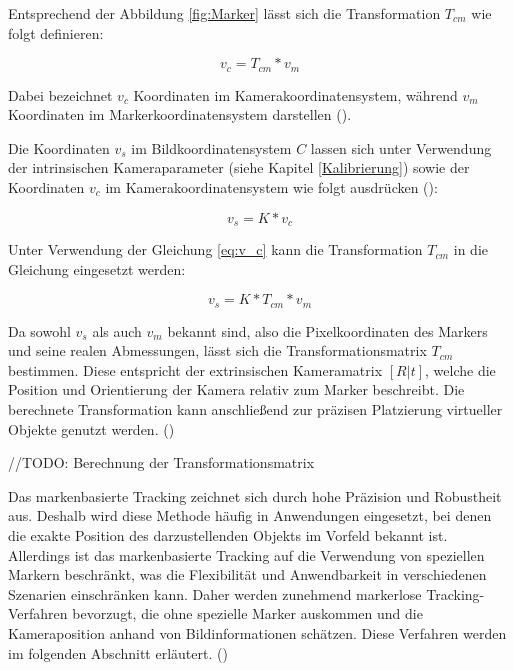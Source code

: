 Entsprechend der Abbildung \ref{fig:Marker} lässt sich die Transformation \( T_{cm} \) wie folgt definieren:

\begin{equation}\label{eq:v_c}
    v_c = T_{cm} * v_m
\end{equation}

Dabei bezeichnet \( v_c \) Koordinaten im Kamerakoordinatensystem, während \( v_m \) Koordinaten im Markerkoordinatensystem darstellen (\cite{doerner2022virtual}).  

Die Koordinaten \( v_s \) im Bildkoordinatensystem \( C \) lassen sich unter Verwendung der intrinsischen Kameraparameter (siehe Kapitel \ref{Kalibrierung}) sowie der Koordinaten \( v_c \) im Kamerakoordinatensystem wie folgt ausdrücken (\cite{doerner2022virtual}):


\begin{equation}
    v_s = K * v_c
\end{equation}

Unter Verwendung der Gleichung \ref{eq:v_c} kann die Transformation \( T_{cm} \) in die Gleichung eingesetzt werden:

\begin{equation}
    v_s = K * T_{cm} * v_m
\end{equation}

Da sowohl \( v_s \) als auch \( v_m \) bekannt sind, also die Pixelkoordinaten des Markers und seine realen Abmessungen, lässt sich die Transformationsmatrix \( T_{cm} \) bestimmen. Diese entspricht der extrinsischen Kameramatrix \( [R|t] \), welche die Position und Orientierung der Kamera relativ zum Marker beschreibt. Die berechnete Transformation kann anschließend zur präzisen Platzierung virtueller Objekte genutzt werden. (\cite{doerner2022virtual}) 

//TODO: Berechnung der Transformationsmatrix

Das markenbasierte Tracking zeichnet sich durch hohe Präzision und Robustheit aus. Deshalb wird diese Methode häufig in Anwendungen eingesetzt, bei denen die exakte Position des darzustellenden Objekts im Vorfeld bekannt ist. Allerdings ist das markenbasierte Tracking auf die Verwendung von speziellen Markern beschränkt, was die Flexibilität und Anwendbarkeit in verschiedenen Szenarien einschränken kann. Daher werden zunehmend markerlose Tracking-Verfahren bevorzugt, die ohne spezielle Marker auskommen und die Kameraposition anhand von Bildinformationen schätzen. Diese Verfahren werden im folgenden Abschnitt erläutert. (\cite{doerner2022virtual})

